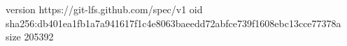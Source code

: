 version https://git-lfs.github.com/spec/v1
oid sha256:db401ea1fb1a7a941617f1c4e8063baeedd72abfce739f1608ebc13cce77378a
size 205392
